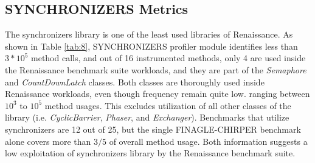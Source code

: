 \documentclass[]{usiinfthesis}
\begin{document}
\begin{table}
\begin{tabular}{|r|r|r|r|r|r|}
 \hline 	
\end{tabular}
\end{table}%

\newpage

 
 \subsection{SYNCHRONIZERS Metrics}
The synchronizers library is one of the least used libraries of Renaissance. As shown in Table \ref{tab:8}, SYNCHRONIZERS profiler module identifies less than \(3*10^5\) method calls, and out of 16 instrumented methods, only 4 are used inside the Renaissance benchmark suite workloads, and they are part of the \textit{Semaphore} and \textit{CountDownLatch} classes. Both classes are thoroughly used inside Renaissance workloads, even though frequency remain quite low. ranging between \(10^3\) to \(10^5\) method usages. This excludes utilization of all other classes of the library (i.e. \textit{CyclicBarrier}, \textit{Phaser}, and \textit{Exchanger}). Benchmarks that utilize synchronizers are 12 out of 25, but the single FINAGLE-CHIRPER benchmark alone covers more than \(3/5\) of overall method usage. Both information suggests a low exploitation of synchronizers library by the Renaissance benchmark suite.
\end{document}
